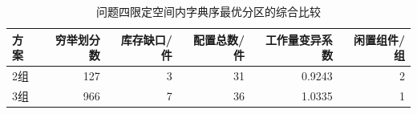 \begin{table}[H]\centering\normalsize
\caption{问题四限定空间内字典序最优分区的综合比较}\label{tab:q4_compare}
\begin{tabular}{lrrrrr}
\toprule
方案 & 穷举划分数 & 库存缺口/件 & 配置总数/件 & 工作量变异系数 & 闲置组件/组\\\midrule
2组 & 127 & 3 & 31 & 0.9243 & 2\\
3组 & 966 & 7 & 36 & 1.0335 & 1\\
\bottomrule\end{tabular}
\end{table}
